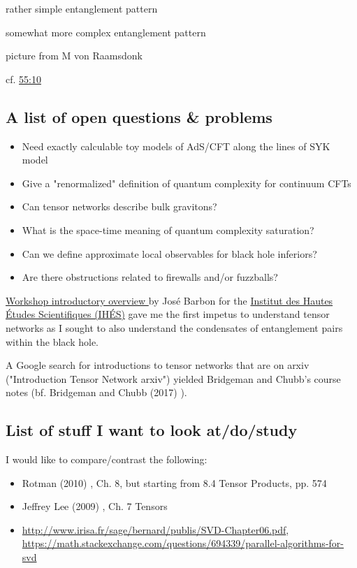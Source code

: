 \documentclass[10pt]{amsart}
\begin{document}
\begin{multicols*}{2}
rather simple entanglement pattern  

somewhat more complex entanglement pattern

picture from M von Raamsdonk  

cf. \href{https://youtu.be/nsxgAOAEgbg?t=55m10s}{55:10}

\subsection*{A list of open questions \& problems}

\begin{itemize}
\item Need exactly calculable toy models of AdS/CFT along the lines of SYK model  
\item Give a "renormalized" definition of quantum complexity for continuum CFTs 
\item Can tensor networks describe bulk gravitons?  
\item What is the space-time meaning of quantum complexity saturation?  
\item Can we define approximate local observables for black hole inferiors?  
\item Are there obstructions related to firewalls and/or fuzzballs?   
\end{itemize}

\href{https://youtu.be/nsxgAOAEgbg}{Workshop introductory overview } by Jos\'{e} Barbon for the \href{https://www.youtube.com/channel/UC4R1IsRVKs_qlWKTm9pT82Q}{Institut des Hautes Études Scientifiques (IHÉS)} gave me the first impetus to understand tensor networks as I sought to also understand the condensates of entanglement pairs within the black hole.  

A Google search for introductions to tensor networks that are on arxiv ("Introduction Tensor Network arxiv") yielded Bridgeman and Chubb's course notes (bf. Bridgeman and Chubb (2017) \cite{BrCh2017}).    

\subsection{List of stuff I want to look at/do/study}  
I would like to compare/contrast the following:  
\begin{itemize}
\item Rotman (2010) \cite{JRotman2010}, Ch. 8, but starting from 8.4 Tensor Products, pp. 574  
\item Jeffrey Lee (2009) \cite{JLee2009}, Ch. 7 Tensors 
\item \url{http://www.irisa.fr/sage/bernard/publis/SVD-Chapter06.pdf}, \url{https://math.stackexchange.com/questions/694339/parallel-algorithms-for-svd}
\end{itemize}




\end{multicols*}
\end{document}
